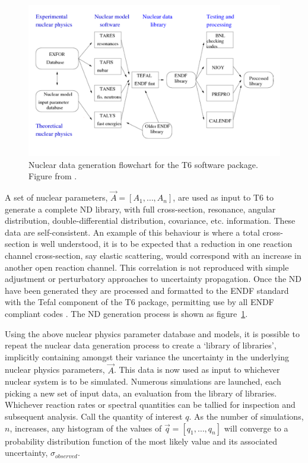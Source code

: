 \begin{figure}
  \centering
  \includegraphics[width=\textwidth]{t6_flow.png}
  \caption{Nuclear data generation flowchart for the T6 software package. Figure from \cite{Koning2013}.}
  \label{fig:t6_overview}
\end{figure}

A set of nuclear parameters, $\vec{A} = [A_{1},\ldots,A_{n}]$, are used as input to T6 to generate a complete ND library, with full cross-section, resonance, angular distribution, double-differential distribution, covariance, etc. information. These data are self-consistent. An example of this behaviour is where a total cross-section is well understood, it is to be expected that a reduction in one reaction channel cross-section, say elastic scattering, would correspond with an increase in another open reaction channel. This correlation is not reproduced with simple adjustment or perturbatory approaches to uncertainty propagation. Once the ND have been generated they are processed and formatted to the ENDF standard with the Tefal component of the T6 package, permitting use by all ENDF compliant codes \cite{Koning2012}. The ND generation process is shown as figure~\ref{fig:t6_overview}.

Using the above nuclear physics parameter database and models, it is possible to repeat the nuclear data generation process to create a `library of libraries', implicitly containing amongst their variance the uncertainty in the underlying nuclear physics parameters, $\vec{A}$. This data is now used as input to whichever nuclear system is to be simulated. Numerous simulations are launched, each picking a new set of input data, an evaluation from the library of libraries. Whichever reaction rates or spectral quantities can be tallied for inspection and subsequent analysis. Call the quantity of interest $q$. As the number of simulations, $n$, increases, any histogram of the values of $\vec{q} = [q_{1},\ldots,q_{n}]$ will converge to a probability distribution function of the most likely value and its associated uncertainty, $\sigma_{observed}$. 

